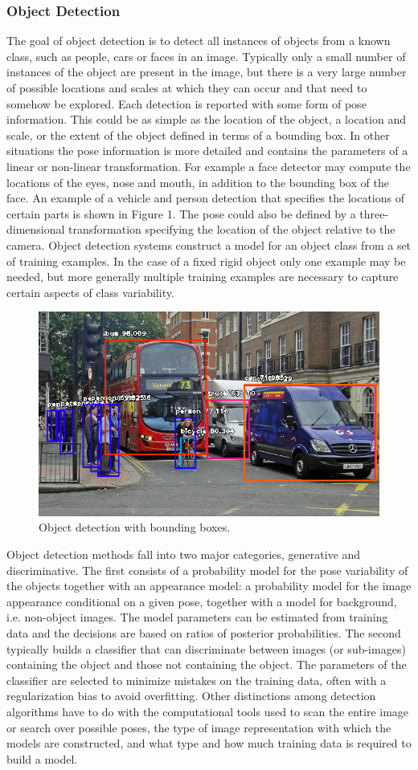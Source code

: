 \documentclass{article}
\begin{document}
\subsubsection{Object Detection}
 The goal of object detection is to detect all instances of objects from a known
class, such as people, cars or faces in an image. Typically only a small number
of instances of the object are present in the image, but there is a very large
number of possible locations and scales at which they can occur and that need
to somehow be explored.
Each detection is reported with some form of pose information. This could
be as simple as the location of the object, a location and scale, or the extent
of the object defined in terms of a bounding box. In other situations the pose
information is more detailed and contains the parameters of a linear or non-linear
transformation. For example a face detector may compute the locations of the
eyes, nose and mouth, in addition to the bounding box of the face. An example
of a vehicle and person detection that specifies the locations of certain parts is shown in
Figure 1. The pose could also be defined by a three-dimensional transformation
specifying the location of the object relative to the camera.
Object detection systems construct a model for an object class from a set of
training examples. In the case of a fixed rigid object only one example may be
needed, but more generally multiple training examples are necessary to capture
certain aspects of class variability.
\begin{figure}[H]
  \centering
  \includegraphics[width=0.5\linewidth]{images/object_det.jpeg}
   \caption{Object detection with bounding boxes.}
\end{figure}

Object detection methods fall into two major categories, generative and discriminative. The first consists of a probability model for the pose variability of the objects together with an appearance model: a probability model for the image appearance conditional on a given pose, together with a model for background, i.e. non-object images. The model parameters can be estimated from training data and the decisions are based on ratios of posterior probabilities. The second typically builds a classifier that can discriminate between images (or sub-images) containing the object and those not containing the object. The parameters of the classifier are selected to minimize mistakes on the training data, often with a regularization bias to avoid overfitting. Other distinctions among detection algorithms have to do with the computational tools used to scan the entire image or search over possible poses, the type of image representation with which the models are constructed, and what type and how much training data is required to build a model.	
\end{document}
